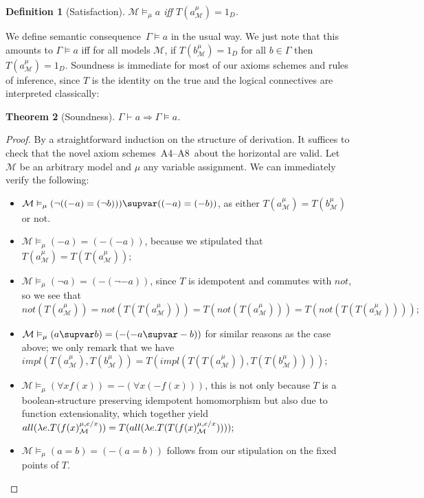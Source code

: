 \documentclass{preprint}
\newtheorem{theorem}{Theorem}[section]
\newtheorem{definition}[theorem]{Definition}
\newcommand{\M}{\mathcal{M}}
\newcommand{\iv}{A4}%
\newcommand{\ahor}{A5}%
\newcommand{\aneg}{A6}%
\newcommand{\aimp}{A7}%
\newcommand{\aquant}{A8}%
\newcommand{\aid}{A9}%
\renewcommand{\to}{\supvar}
\begin{document}
\begin{definition}[Satisfaction] \label{def:satisf}
	$\M \vDash_{\mu} a$ iff ${T(a^{\mu}_{\M})} = 1_D$. 
\end{definition}


We define semantic consequence~$\Gamma \vDash a$ in the usual way. 
We just note that this amounts to $\Gamma \vDash a$ iff for all models $\M$, if ${T(b^{\mu}_{\M})} = 1_D$ for all $b \in \Gamma$ then ${T(a^{\mu}_{\M})} = 1_D$. 
Soundness is immediate for most of our axioms schemes and rules of inference, since $T$ is the identity on the true and the logical connectives are interpreted classically: 

\begin{theorem}[Soundness]
	$\Gamma \vdash a \Longrightarrow \Gamma \vDash a$. 
\end{theorem}
\begin{proof}
	By a straightforward induction on the structure of derivation. It suffices to check that the novel axiom schemes~\iv--\aquant~about the horizontal are valid. Let $\M$ be an arbitrary model and $\mu$ any variable assignment. We can immediately verify the following:
	\begin{itemize}
		\item[\iv.] $\M \vDash_{\mu} (\neg ((-a)=(\neg b)))\to((-a) = (-b))$, as 
		either $T(a^{\mu}_\M) = T(b^{\mu}_\M)$ or not. 
		
		\item[\ahor.] $\M \vDash_{\mu} (-a) = (-(-a))$, because we stipulated that $T(a^{\mu}_\M) = T(T(a^{\mu}_\M))$; 
		
		\item[\aneg.] $\M \vDash_{\mu} (\neg a) = (-(\neg -a))$, since $T$ is idempotent and commutes with $not$, so we see that
		$not(T(a^{\mu}_\M)) = not(T(T(a^{\mu}_\M))) = T(not(T(a^{\mu}_\M))) = T(not(T(T(a^{\mu}_\M))));$
		
		\item[\aimp.] $\M \vDash_{\mu} (a \to b) = (-(-a \to -b))$ for similar reasons as the case above; we only remark that we have  $impl(T(a^{\mu}_\M), T(b^{\mu}_\M)) = T(impl(T(T(a^{\mu}_\M)), T(T(b^{\mu}_\M))));$
		
		\item[\aquant.] 
		$\M \vDash_{\mu} (\forall x f(x)) = -(\forall x (-f(x)))$, this is not only because $T$ is a boolean-structure preserving idempotent homomorphism but also due to function extensionality, which together yield $all(\lambda e. T({f(x)}^{\mu, e/x}_\mathcal{M})) = T(all(\lambda e. T(T({f(x)}^{\mu, e/x}_\mathcal{M}))));$

		\item[\aid.] $\M \vDash_{\mu} (a = b) = (-(a = b))$ follows from our stipulation on the fixed points of $T$. 
	\end{itemize}
\end{proof}
\end{document}
